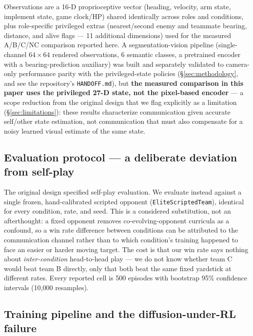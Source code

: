 \documentclass[11pt]{article}
\begin{document}
Observations are a 16-D proprioceptive vector (heading, velocity, arm
state, implement state, game clock/HP) shared identically across roles
and conditions, plus role-specific privileged extras (nearest/second
enemy and teammate bearing, distance, and alive flags --- 11 additional
dimensions) used for the measured A/B/C/NC comparison reported here. A
segmentation-vision pipeline (single-channel $64 \times 64$ rendered
observations, 6 semantic classes, a pretrained encoder with a
bearing-prediction auxiliary) was built and separately validated to
camera-only performance parity with the privileged-state policies
(\S\ref{sec:methodology}, and see the repository's
\texttt{HANDOFF.md}), but \textbf{the measured comparison in this paper
uses the privileged 27-D state, not the pixel-based encoder} --- a scope
reduction from the original design that we flag explicitly as a
limitation (\S\ref{sec:limitations}): these results characterize
communication given accurate self/other state estimation, not
communication that must also compensate for a noisy learned visual
estimate of the same state.

\subsection{Evaluation protocol --- a deliberate deviation from self-play}
\label{sec:evalprotocol}

The original design specified self-play evaluation. We evaluate instead
against a single frozen, hand-calibrated scripted opponent
(\texttt{EliteScriptedTeam}), identical for every condition, rate, and
seed. This is a considered substitution, not an afterthought: a fixed
opponent removes co-evolving-opponent curricula as a confound, so a win
rate difference between conditions can be attributed to the
communication channel rather than to which condition's training
happened to face an easier or harder moving target. The cost is that
our win rate says nothing about \emph{inter-condition} head-to-head
play --- we do not know whether team C would beat team B directly, only
that both beat the same fixed yardstick at different rates. Every
reported cell is 500 episodes with bootstrap 95\% confidence intervals
(10{,}000 resamples).

\subsection{Training pipeline and the diffusion-under-RL failure}
\label{sec:pipeline}
\end{document}
